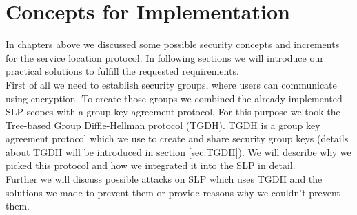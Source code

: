 \newpage
\section{Concepts for Implementation}\label{sec:concepts}
In chapters above we discussed some possible security concepts and increments for the service location protocol. In following sections we will introduce our practical solutions to fulfill the requested requirements.\\
First of all we need to establish security groups, where users can communicate using encryption. To create those groups we combined the already implemented SLP scopes with a group key agreement protocol. For this purpose we took the Tree-based Group Diffie-Hellman protocol (TGDH). TGDH is a group key agreement protocol which we use to create and share security group keys (details about TGDH will be introduced in section \ref{sec:TGDH}). We will describe why we picked this protocol and how we integrated it into the SLP in detail.\\
Further we will discuss possible attacks on SLP which uses TGDH and the solutions we made to prevent them or provide reasons why we couldn't prevent them.

